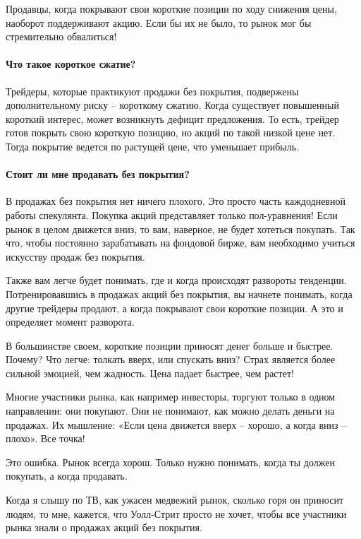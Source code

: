 \documentclass[a5paper]{article}
\begin{document}
Продавцы, когда покрывают свои короткие позиции по ходу снижения цены,
наоборот поддерживают акцию. Если бы их не было, то рынок мог бы
стремительно обвалиться!

\paragraph{Что такое короткое сжатие?}

Трейдеры, которые практикуют продажи без покрытия, подвержены
дополнительному риску – короткому сжатию. Когда существует повышенный
короткий интерес, может возникнуть дефицит предложения. То есть,
трейдер готов покрыть свою короткую позицию, но акций по такой низкой
цене нет. Тогда покрытие ведется по растущей цене, что уменьшает
прибыль.

\paragraph{Стоит ли мне продавать без покрытия?}

В продажах без покрытия нет ничего плохого. Это просто часть каждодневной работы спекулянта. Покупка акций представляет только пол-уравнения! Если рынок в целом движется вниз, то вам, наверное, не будет хотеться покупать. Так что, чтобы постоянно зарабатывать на фондовой бирже, вам необходимо учиться искусству продаж без покрытия.

Также вам легче будет понимать, где и когда происходят развороты тенденции. Потренировавшись в продажах акций без покрытия, вы начнете понимать, когда другие трейдеры продают, а когда покрывают свои короткие позиции. А это и определяет момент разворота.

В большинстве своем, короткие позиции приносят денег больше и быстрее. Почему? Что легче: толкать вверх, или спускать вниз? Страх является более сильной эмоцией, чем жадность. Цена падает быстрее, чем растет!

Многие участники рынка, как например инвесторы, торгуют только в одном направлении: они покупают. Они не понимают, как можно делать деньги на продажах. Их мышление: «Если цена движется вверх – хорошо, а когда вниз – плохо». Все точка!

Это ошибка. Рынок всегда хорош. Только нужно понимать, когда ты должен покупать, а когда продавать.

Когда я слышу по ТВ, как ужасен медвежий рынок, сколько горя он
приносит людям, то мне, кажется, что Уолл-Стрит просто не хочет, чтобы
все участники рынка знали о продажах акций без покрытия.
\end{document}
